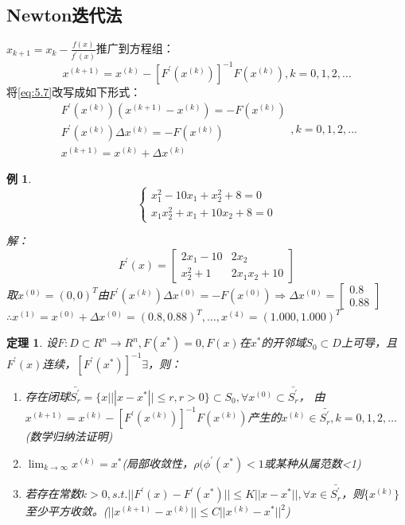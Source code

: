 \documentclass[a4paper]{article}
\newtheorem{theorem}{定理}[section]
\newtheorem{example}{例}[section]
\begin{document}
\subsection{Newton迭代法}
$x_{k+1}=x_k-\frac{f(x)}{f^{'}(x)} $推广到方程组：
\begin{equation}
    x^{(k+1)}=x^{(k)}-[F^{'}(x^{(k)})]^{-1}F(x^{(k)}) , k=0,1,2,\dots
    \label{eq:5.7}
\end{equation}
将\ref{eq:5.7}改写成如下形式：
\begin{equation*}
    \begin{array}{lr}
        F^{'}(x^{(k)})(x^{(k+1)}-x^{(k)})=-F(x^{(k)})\\
        F^{'}(x^{(k)})\Delta x^{(k)}=-F(x^{(k)}) \\
        x^{(k+1)}=x^{(k)}+\Delta x^{(k)}
    \end{array}
    ,k=0,1,2,\dots
\end{equation*}

\begin{example}
    $$\left\{
        \begin{array}{lr}
            x_1^2-10x_1+x_2^2+8=0\\
            x_1x_2^2+x_1+10x_2+8=0
        \end{array}\right.
        $$
    
    解：
    $$F^{'}(x)=\left[\begin{matrix}
        2x_1-10 & 2x_2 \\
        x_2^2+1 & 2x_1x_2+10
    \end{matrix}\right] $$
    取$x^{(0)}=(0, 0)^T $由$F^{'}(x^{(k)})\Delta x^{(0)}=-F(x^{(0)})\Rightarrow \Delta x^{(0)}=\left[\begin{matrix}
        0.8 \\ 0.88
    \end{matrix}\right] $\\
    $\therefore x^{(1)}=x^{(0)}+\Delta x^{(0)}=(0.8, 0.88)^T, \dots, x^{(4)}=(1.000, 1.000)^T $
\end{example}

\begin{theorem}
    设$F:D\subset R^n\rightarrow R^n, F(x^*)=0, F(x)$在$x^*$的开邻域$S_0\subset D$上可导，且$F^{'}(x) $连续，$[F^{'}(x^*)]^{-1}\exists$，则：
    \begin{enumerate}
        \item 存在闭球$\bar{S_r^{'}}=\{x|||x-x^*||\le r, r>0\}\subset S_0, \forall x^{(0)}\subset \bar{S_r^{'}} $，
            由$x^{(k+1)}=x^{(k)}-[F^{'}(x^{(k)})]^{-1}F(x^{(k)}) $产生的$x^{(k)}\in \bar{S_r^{'}}, k=0,1,2,\dots$(数学归纳法证明)
        \item $\lim_{k\rightarrow\infty} x^{(k)}=x^*$(局部收敛性，$\rho(\phi^{'}(x^*)<1$或某种从属范数<1)
        \item 若存在常数$k>0, s.t. ||F^{'}(x)-F^{'}(x^*) ||\le K||x-x^*||, \forall x \in \bar{S_r^{'}}$，则$\{x^{(k)} \}$至少平方收敛。($||x^{(k+1)}-x^{(k)}||\le C||x^{(k)}-x^*||^2$)
    \end{enumerate}
\end{theorem}
\end{document}
